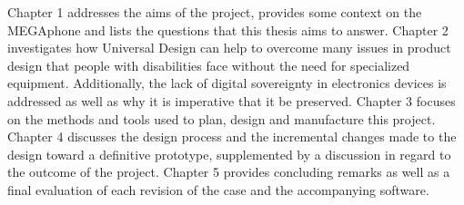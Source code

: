 Chapter 1 addresses the aims of the project, provides some context on the MEGAphone and lists the questions that this thesis aims to answer. 
Chapter 2 investigates how Universal Design can help to overcome many issues in product design that people with disabilities face without the need for specialized equipment. 
Additionally, the lack of digital sovereignty in electronics devices is addressed as well as why it is imperative that it be preserved.
Chapter 3 focuses on the methods and tools used to plan, design and manufacture this project.
Chapter 4 discusses the design process and the incremental changes made to the design toward a definitive prototype, supplemented by a discussion in regard to the outcome of the project. 
Chapter 5 provides concluding remarks as well as a final evaluation of each revision of the case and the accompanying software.